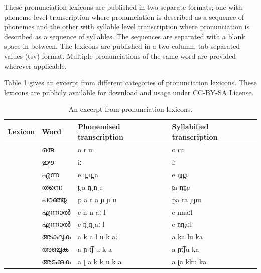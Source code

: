 \documentclass{ieeeaccess}
\begin{document}
These pronunciation lexicons are published in two separate formats; one with phoneme level transcription where pronunciation is described as a sequence of phonemes and the other with syllable level transcription where pronunciation is described as a sequence of syllables. The sequences are separated with a blank space in between. The lexicons are published in a two column, tab separated values (tsv) format. Multiple pronunciations of the same word are provided wherever applicable. 

Table \ref{lexiconsamples}  gives an excerpt from different categories of pronunciation lexicons. These lexicons are publicly available for download and usage under CC-BY-SA License.


\begin{table}[!h]
	\begin{center}
		\begin{minipage}{\textwidth}
			\caption{An excerpt from pronunciation lexicons.}\label{lexiconsamples}
			\begin{tabular}{@{}p{1.2cm}p{1.5cm}p{2cm}p{2.2cm}@{}}
				\hline
				\hline
				Lexicon                      & Word              & Phonemised transcription          & Syllabified transcription  \\
				\hline
				\multirow{6}{*}{\rotatebox{60}{Common words}}   & {\mal ഒരു}         & {\ipa o ɾ uː}                     & {\ipa o ɾu}                \\
				                                & {\mal ഈ}          & {\ipa iː}                         & {\ipa iː}                  \\
				                                & {\mal എന്ന}        & {\ipa e n̪ n̪ a}                    & {\ipa e n̪n̪a}               \\
				                                & {\mal തന്നെ}       & {\ipa t̪ a n̪ n̪ e}                  & {\ipa t̪a n̪n̪e}              \\
				                                & {\mal പറഞ്ഞു}       & {\ipa p a r a ɲ ɲ u}              & {\ipa pa ra ɲɲu }          \\
				                                & {\mal എന്നാൽ}      & {\ipa e n n aː l}                 & {\ipa e nnaːl}             \\
				                                & {\mal എന്നാൽ}      & {\ipa e n̪ n̪ aː l}                 & {\ipa e n̪n̪aːl}             \\

				\hline
				\multirow{3}{*}{\rotatebox{60}{Verbs}}          & {\mal അകലുക}       & {\ipa a k a l u k aː}             & {\ipa a ka lu ka}          \\
				                                & {\mal അഞ്ചുക}       & {\ipa a ɲ t͡ʃ u k a}               & {\ipa a ɲt͡ʃu ka}           \\
				                                & {\mal അടക്കുക}      & {\ipa a ʈ a k k u k a   }         & {\ipa a ʈa kku ka}         \\


\end{tabular}
\end{minipage}
\end{center}
\end{table}
\end{document}
